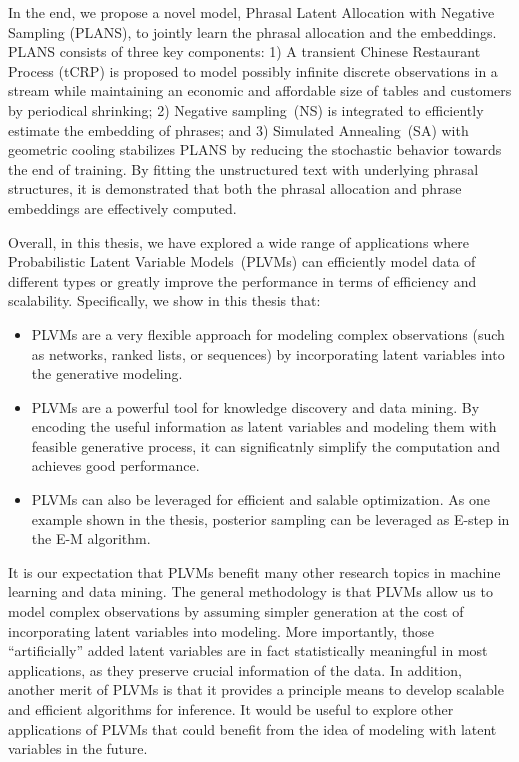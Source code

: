 In the end, we propose a novel model, Phrasal Latent Allocation with Negative
Sampling (PLANS), to jointly learn the phrasal allocation and the embeddings.
PLANS consists of three key components: 1) A transient Chinese Restaurant
Process (tCRP) is proposed to model possibly infinite discrete observations in a
stream while maintaining an economic and affordable size of tables and customers
by periodical shrinking; 2) Negative sampling~(NS) is integrated to efficiently
estimate the embedding of phrases; and 3) Simulated Annealing~(SA) with
geometric cooling stabilizes PLANS by reducing the stochastic behavior towards
the end of training.  By fitting the unstructured text with underlying phrasal
structures, it is demonstrated that both the phrasal allocation and phrase
embeddings are effectively computed.

Overall, in this thesis, we have explored a wide range of applications where
Probabilistic Latent Variable Models~(PLVMs) can efficiently model data of
different types or greatly improve the performance in terms of efficiency and
scalability. Specifically, we show in this thesis that:

\begin{itemize}
\item PLVMs are a very flexible approach for modeling complex observations (such
  as networks, ranked lists, or sequences) by incorporating latent variables
  into the generative modeling.
\item PLVMs are a powerful tool for knowledge discovery and data mining. By
  encoding the useful information as latent variables and modeling them with
  feasible generative process, it can significatnly simplify the computation and
  achieves good performance.
\item PLVMs can also be leveraged for efficient and salable optimization. As one
  example shown in the thesis, posterior sampling can be leveraged as E-step in
  the E-M algorithm.
\end{itemize}

It is our expectation that PLVMs benefit many other research topics in machine
learning and data mining. The general methodology is that PLVMs allow us to
model complex observations by assuming simpler generation at the cost of
incorporating latent variables into modeling. More importantly, those
``artificially'' added latent variables are in fact statistically meaningful in
most applications, as they preserve crucial information of the data.  In
addition, another merit of PLVMs is that it provides a principle means to
develop scalable and efficient algorithms for inference.  It would be useful to
explore other applications of PLVMs that could benefit from the idea of modeling
with latent variables in the future.
